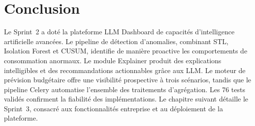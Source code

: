 \section*{Conclusion}

Le Sprint~2 a doté la plateforme LLM Dashboard de capacités d'intelligence artificielle avancées. Le pipeline de détection d'anomalies, combinant STL, Isolation Forest et CUSUM, identifie de manière proactive les comportements de consommation anormaux. Le module Explainer produit des explications intelligibles et des recommandations actionnables grâce aux LLM. Le moteur de prévision budgétaire offre une visibilité prospective à trois scénarios, tandis que le pipeline Celery automatise l'ensemble des traitements d'agrégation. Les 76 tests validés confirment la fiabilité des implémentations. Le chapitre suivant détaille le Sprint~3, consacré aux fonctionnalités entreprise et au déploiement de la plateforme.
